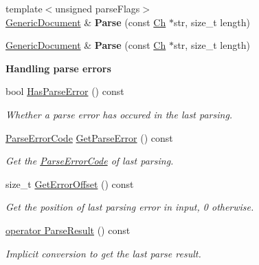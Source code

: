 \begin{Indent}
\begin{DoxyCompactItemize}
{\footnotesize template$<$unsigned parse\+Flags$>$ }\\\hyperlink{class_generic_document}{Generic\+Document} \& {\bfseries Parse} (const \hyperlink{class_generic_value_ade0e0ce64ccd5d852da57a35e720bafb}{Ch} $\ast$str, size\+\_\+t length)
\item 
\mbox{\label{class_generic_document_ab13d8358acc0648e3f91f6b825365e4f}} 
\hyperlink{class_generic_document}{Generic\+Document} \& {\bfseries Parse} (const \hyperlink{class_generic_value_ade0e0ce64ccd5d852da57a35e720bafb}{Ch} $\ast$str, size\+\_\+t length)
\end{DoxyCompactItemize}
\end{Indent}
\begin{Indent}\textbf{ Handling parse errors}\par
\begin{DoxyCompactItemize}
\item 
\mbox{\label{class_generic_document_a510a0588db4eb372f5d81bc3646578fb}} 
bool \hyperlink{class_generic_document_a510a0588db4eb372f5d81bc3646578fb}{Has\+Parse\+Error} () const
\begin{DoxyCompactList}\small\item\em Whether a parse error has occured in the last parsing. \end{DoxyCompactList}\item 
\mbox{\label{class_generic_document_a9400a5bd3169cc6ed545e681ccc06070}} 
\hyperlink{group___r_a_p_i_d_j_s_o_n___e_r_r_o_r_s_ga8d4b32dfc45840bca189ade2bbcb6ba7}{Parse\+Error\+Code} \hyperlink{class_generic_document_a9400a5bd3169cc6ed545e681ccc06070}{Get\+Parse\+Error} () const
\begin{DoxyCompactList}\small\item\em Get the \hyperlink{group___r_a_p_i_d_j_s_o_n___e_r_r_o_r_s_ga8d4b32dfc45840bca189ade2bbcb6ba7}{Parse\+Error\+Code} of last parsing. \end{DoxyCompactList}\item 
\mbox{\label{class_generic_document_ae1ef7ca99ced428e9300c68e5142afdb}} 
size\+\_\+t \hyperlink{class_generic_document_ae1ef7ca99ced428e9300c68e5142afdb}{Get\+Error\+Offset} () const
\begin{DoxyCompactList}\small\item\em Get the position of last parsing error in input, 0 otherwise. \end{DoxyCompactList}\item 
\hyperlink{class_generic_document_af9bb8eade3eae0c039161378e8d2923a}{operator Parse\+Result} () const
\begin{DoxyCompactList}\small\item\em Implicit conversion to get the last parse result. \end{DoxyCompactList}\end{DoxyCompactItemize}
\end{Indent}
